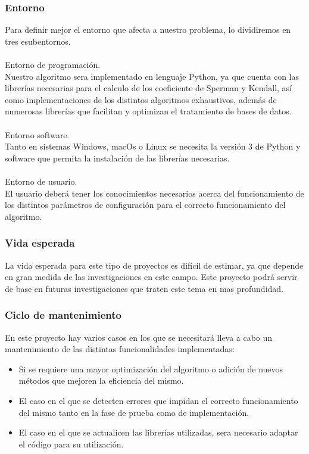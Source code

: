 \documentclass[a4paper, 12pt]{book}
\begin{document}
\subsubsection{Entorno}

Para definir mejor el entorno que afecta a nuestro problema, lo dividiremos en tres esubentornos.\\
\\
Entorno de programación.\\

Nuestro algoritmo sera implementado en lenguaje Python, ya que cuenta con las librerías necesarias para el calculo de los coeficiente de Sperman y Kendall, así como implementaciones de los distintos algoritmos exhaustivos, además de numerosas librerías que facilitan y optimizan el tratamiento de bases de datos.\\
\\
Entorno software.\\

Tanto en sistemas Windows, macOs o Linux se necesita la versión 3 de Python y software que permita la instalación de las librerías necesarias. \\
\\
Entorno de usuario.\\

El usuario deberá tener los conocimientos necesarios acerca del funcionamiento de los distintos parámetros de configuración para el correcto funcionamiento del algoritmo.


\subsubsection{Vida esperada}

La vida esperada para este tipo de proyectos es difícil de estimar, ya que depende en gran medida de las investigaciones en este campo. Este proyecto podrá servir de base en futuras investigaciones que traten este tema en mas profundidad.\\

\subsubsection{Ciclo de mantenimiento}

En este proyecto hay varios casos en los que se necesitará lleva a cabo un mantenimiento de las distintas funcionalidades implementadas:
\begin{itemize}
\item Si se requiere una mayor optimización del algoritmo o adición de nuevos métodos que mejoren la eficiencia del mismo.

\item El caso en el que se detecten errores que impidan el correcto funcionamiento del mismo tanto en la fase de prueba como de implementación.

\item El caso en el que se actualicen las librerías utilizadas, sera necesario adaptar el código para su utilización.
\end{itemize}
\end{document}

